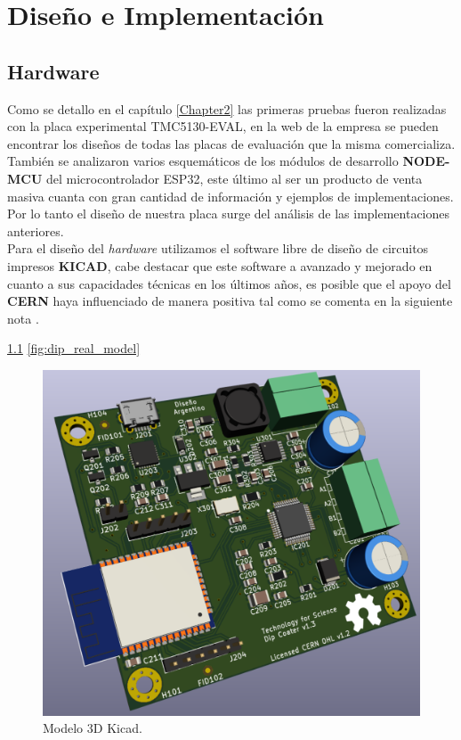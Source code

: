 
\chapter{Diseño e Implementación} %

\label{Chapter3} %

\section{Hardware}

Como se detallo en el capítulo \ref{Chapter2} las primeras pruebas fueron realizadas con la placa experimental TMC5130-EVAL, en la web de la empresa \citep{3_web_trinamic} se pueden encontrar los diseños de todas las placas de evaluación que la misma comercializa. También se analizaron varios esquemáticos de los módulos de desarrollo \textbf{NODE-MCU} del microcontrolador ESP32, este último al ser un producto de venta masiva cuanta con gran cantidad de información y ejemplos de implementaciones. Por lo tanto el diseño de nuestra placa surge del análisis de las implementaciones anteriores.
\\
Para el diseño del \textit{hardware} utilizamos el software libre de diseño de circuitos impresos \textbf{KICAD}, cabe destacar que este software a avanzado y mejorado en cuanto a sus capacidades técnicas en los últimos años, es posible que el apoyo del \textbf{CERN} haya influenciado de manera positiva tal como se comenta en la siguiente nota \citep{1_nota_web_kicad_cern}.

\ref{fig:dip_3d_model}
\ref{fig:dip_real_model}

\begin{figure}[htbp]
	\centering
	\includegraphics[width=.5\textwidth]{./Figures/dip_3d_model.pdf}
	\caption{Modelo 3D Kicad.}
	\label{fig:dip_3d_model}
\end{figure}
         

